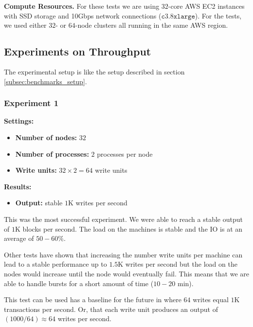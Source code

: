 \medskip
\noindent\textbf{Compute Resources.} For these tests we are using $32$-core AWS EC2 instances with SSD storage and 10Gbps network connections ($\mathtt{c3.8xlarge}$).
For the tests, we used either $32$- or $64$-node clusters all running in the same AWS region.

\subsection{Experiments on Throughput}
The experimental setup is like the setup described in section \ref{subsec:benchmarks_setup}. 

\subsubsection{Experiment 1}\label{subsubsec:appendix_benchmarks_exp1}

\medskip
\noindent\textbf{Settings:}
\begin{itemize}
 \item \textbf{Number of nodes:} $32$
 \item \textbf{Number of processes:} $2$ processes per node
 \item \textbf{Write units:} $32 \times 2 = 64$ write units
\end{itemize}

\medskip
\noindent\textbf{Results:}
\begin{itemize}
 \item \textbf{Output:} stable $1$K writes per second
\end{itemize}

This was the most successful experiment. We were able to reach a stable output of $1$K blocks per second. The load on the machines is stable and the IO is at an average of $50-60 \%$.

Other tests have shown that increasing the number write units per machine can lead to a stable performance up to $1.5$K writes per second but the load on the nodes would increase until the node would eventually fail. 
This means that we are able to handle bursts for a short amount of time ($10-20$ min).

This test can be used has a baseline for the future in where $64$ writes equal $1$K transactions per second. 
Or, that each write unit produces an output of $(1000/64) \approx 64$ writes per second.

